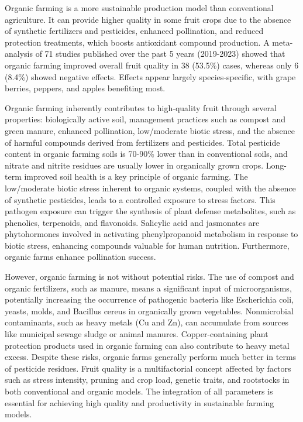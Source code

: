 \vspace{0.5em}
Organic farming is a more sustainable production model than conventional agriculture. It can provide higher quality in some fruit crops due to the absence of synthetic fertilizers and pesticides, enhanced pollination, and reduced protection treatments, which boosts antioxidant compound production. A meta-analysis of 71 studies published over the past 5 years (2019-2023) showed that organic farming improved overall fruit quality in 38 (53.5\%) cases, whereas only 6 (8.4\%) showed negative effects. Effects appear largely species-specific, with grape berries, peppers, and apples benefiting most.

\vspace{0.5em}
Organic farming inherently contributes to high-quality fruit through several properties: biologically active soil, management practices such as compost and green manure, enhanced pollination, low/moderate biotic stress, and the absence of harmful compounds derived from fertilizers and pesticides. Total pesticide content in organic farming soils is 70-90\% lower than in conventional soils, and nitrate and nitrite residues are usually lower in organically grown crops. Long-term improved soil health is a key principle of organic farming. The low/moderate biotic stress inherent to organic systems, coupled with the absence of synthetic pesticides, leads to a controlled exposure to stress factors. This pathogen exposure can trigger the synthesis of plant defense metabolites, such as phenolics, terpenoids, and flavonoids. Salicylic acid and jasmonates are phytohormones involved in activating phenylpropanoid metabolism in response to biotic stress, enhancing compounds valuable for human nutrition. Furthermore, organic farms enhance pollination success.

\vspace{0.5em}
However, organic farming is not without potential risks. The use of compost and organic fertilizers, such as manure, means a significant input of microorganisms, potentially increasing the occurrence of pathogenic bacteria like Escherichia coli, yeasts, molds, and Bacillus cereus in organically grown vegetables. Nonmicrobial contaminants, such as heavy metals (Cu and Zn), can accumulate from sources like municipal sewage sludge or animal manures. Copper-containing plant protection products used in organic farming can also contribute to heavy metal excess. Despite these risks, organic farms generally perform much better in terms of pesticide residues. Fruit quality is a multifactorial concept affected by factors such as stress intensity, pruning and crop load, genetic traits, and rootstocks in both conventional and organic models. The integration of all parameters is essential for achieving high quality and productivity in sustainable farming models.


